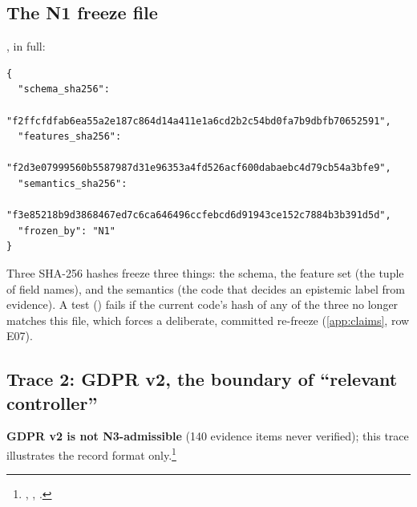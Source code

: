 \subsection{The N1 freeze file}

, in full:

{\small
\begin{verbatim}
{
  "schema_sha256":
    "f2ffcfdfab6ea55a2e187c864d14a411e1a6cd2b2c54bd0fa7b9dbfb70652591",
  "features_sha256":
    "f2d3e07999560b5587987d31e96353a4fd526acf600dabaebc4d79cb54a3bfe9",
  "semantics_sha256":
    "f3e85218b9d3868467ed7c6ca646496ccfebcd6d91943ce152c7884b3b391d5d",
  "frozen_by": "N1"
}
\end{verbatim}
}

Three SHA-256 hashes freeze three things: the  schema, the feature set (the
tuple of  field names), and the semantics (the code that decides an epistemic
label from evidence). A test () fails if the current code's
hash of any of the three no longer matches this file, which forces a deliberate, committed re-freeze
(\cref{app:claims}, row E07).

\subsection{Trace 2: GDPR v2, the boundary of \enquote{relevant controller}}

\textbf{GDPR v2 is not N3-admissible} (140 evidence items never verified); this trace illustrates the
record format only.\footnote{, , 
.}

